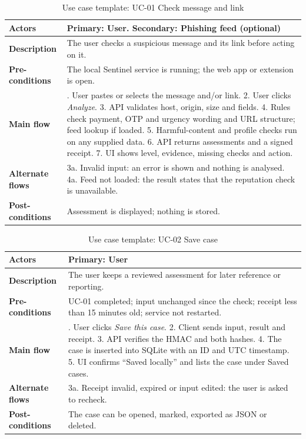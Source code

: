 \begin{table}[H]
\centering
\footnotesize
\renewcommand{\arraystretch}{1.2}
\caption{Use case template: UC-01 Check message and link}
\label{tab:uc1}
\begin{tabular}{|>{\raggedright\arraybackslash}p{2.9cm}|>{\raggedright\arraybackslash}p{12.0cm}|}
\hline
\textbf{Actors} & Primary: User. Secondary: Phishing feed (optional) \\ \hline
\textbf{Description} & The user checks a suspicious message and its link before acting on it. \\ \hline
\textbf{Pre-conditions} & The local Sentinel service is running; the web app or extension is open. \\ \hline
\textbf{Main flow} & 1. User pastes or selects the message and/or link. 2. User clicks \emph{Analyze}. 3. API validates host, origin, size and fields. 4. Rules check payment, OTP and urgency wording and URL structure; feed lookup if loaded. 5. Harmful-content and profile checks run on any supplied data. 6. API returns assessments and a signed receipt. 7. UI shows level, evidence, missing checks and action. \\ \hline
\textbf{Alternate flows} & 3a. Invalid input: an error is shown and nothing is analysed. 4a. Feed not loaded: the result states that the reputation check is unavailable. \\ \hline
\textbf{Post-conditions} & Assessment is displayed; nothing is stored. \\ \hline
\end{tabular}
\end{table}

\begin{table}[H]
\centering
\footnotesize
\renewcommand{\arraystretch}{1.2}
\caption{Use case template: UC-02 Save case}
\label{tab:uc2}
\begin{tabular}{|>{\raggedright\arraybackslash}p{2.9cm}|>{\raggedright\arraybackslash}p{12.0cm}|}
\hline
\textbf{Actors} & Primary: User \\ \hline
\textbf{Description} & The user keeps a reviewed assessment for later reference or reporting. \\ \hline
\textbf{Pre-conditions} & UC-01 completed; input unchanged since the check; receipt less than 15 minutes old; service not restarted. \\ \hline
\textbf{Main flow} & 1. User clicks \emph{Save this case}. 2. Client sends input, result and receipt. 3. API verifies the HMAC and both hashes. 4. The case is inserted into SQLite with an ID and UTC timestamp. 5. UI confirms ``Saved locally'' and lists the case under Saved cases. \\ \hline
\textbf{Alternate flows} & 3a. Receipt invalid, expired or input edited: the user is asked to recheck. \\ \hline
\textbf{Post-conditions} & The case can be opened, marked, exported as JSON or deleted. \\ \hline
\end{tabular}
\end{table}

